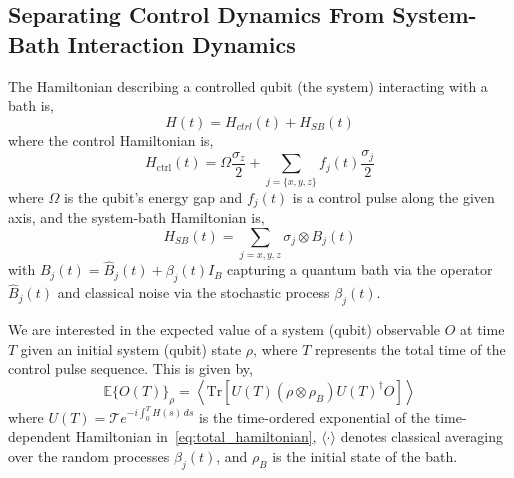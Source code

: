 \documentclass[12pt]{iopart}
\begin{document}
\subsection{Separating Control Dynamics From System-Bath Interaction Dynamics \label{subsec:separating_control_dynamics_from_system_environment_interaction_dynamics}}
The Hamiltonian describing a controlled qubit (the system) interacting with a bath is,
\begin{equation}
    \label{eq:total_hamiltonian}
    H(t) = H_{ctrl}(t) + H_{SB}(t)
\end{equation}
where the control Hamiltonian is,
\begin{equation}
    \label{eq:control_hamiltonian}
    H_{\mathrm{ctrl}}(t)=\Omega \frac{\sigma_{z}}{2}+\sum_{j=\{x, y, z\}} f_{j}(t) \frac{\sigma_{j}}{2}
\end{equation}
where $\Omega$ is the qubit's energy gap and $f_j(t)$ is a control pulse along the given axis, and the system-bath Hamiltonian is,
\begin{equation}
    \label{eq:system_bath_hamiltonian}
    H_{SB}(t) = \sum_{j=x, y, z} \sigma_{j} \otimes B_{j}(t)
\end{equation}
with $B_{j}(t)=\hat{B}_{j}(t)+\beta_{j}(t) I_{B}$ capturing a quantum bath via the operator $\hat{B}_{j}(t)$ and classical noise via the stochastic process $\beta_{j}(t)$.

We are interested in the expected value of a system (qubit) observable $O$ at time $T$ given an initial system (qubit) state $\rho$, where $T$ represents the total time of the control pulse sequence. This is given by,
\begin{equation} \label{eq:initial_expectation}
    \mathbb{E}\{O(T)\}_{\rho}=\left\langle\mathrm{Tr}\left[U(T)\left(\rho \otimes \rho_{B}\right) U(T)^{\dagger} O\right]\right\rangle
\end{equation}
where $U(T)=\mathcal{T} e^{-i \int_{0}^{T} H(s) \, ds}$ is the time-ordered exponential of the time-dependent Hamiltonian in~\cref{eq:total_hamiltonian}, $\langle\cdot\rangle$ denotes classical averaging over the random processes $\beta_{j}(t)$, and $\rho_{B}$ is the initial state of the bath.
\end{document}

